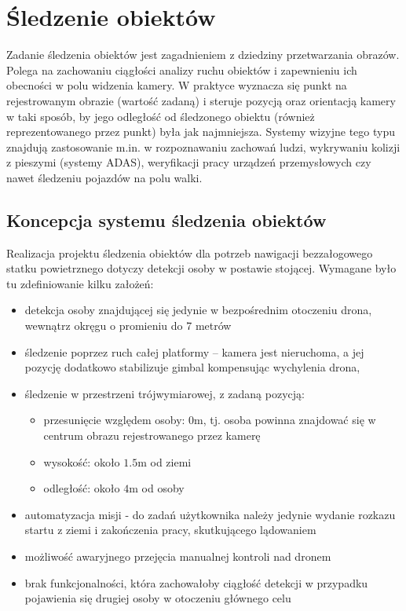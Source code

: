 
\chapter{Śledzenie obiektów}
\label{cha:sledzenieObiektow}

Zadanie śledzenia obiektów jest zagadnieniem z dziedziny przetwarzania obrazów. Polega na zachowaniu ciągłości analizy ruchu obiektów i zapewnieniu ich obecności w polu widzenia kamery. W praktyce wyznacza się punkt na rejestrowanym obrazie (wartość zadaną) i steruje pozycją oraz orientacją kamery w taki sposób, by jego odległość od śledzonego obiektu (również reprezentowanego przez punkt) była jak najmniejsza. Systemy wizyjne tego typu znajdują zastosowanie m.in. w rozpoznawaniu zachowań ludzi, wykrywaniu kolizji z pieszymi (systemy ADAS), weryfikacji pracy urządzeń przemysłowych czy nawet śledzeniu pojazdów na polu walki.
\section{Koncepcja systemu śledzenia obiektów}
\label{sec:koncepcja}
Realizacja projektu śledzenia obiektów dla potrzeb nawigacji bezzałogowego statku powietrznego dotyczy detekcji osoby w postawie stojącej. Wymagane było tu zdefiniowanie kilku założeń:
\begin{itemize}
	\item detekcja osoby znajdującej się jedynie w bezpośrednim otoczeniu drona, wewnątrz okręgu o promieniu do 7 metrów
	\item śledzenie poprzez ruch całej platformy -- kamera jest nieruchoma, a jej pozycję dodatkowo stabilizuje gimbal kompensując wychylenia drona,
	\item śledzenie w przestrzeni trójwymiarowej, z zadaną pozycją:
	\begin{itemize}
		\item przesunięcie względem osoby: $0$m, tj. osoba powinna znajdować się w centrum obrazu rejestrowanego przez kamerę
		\item wysokość: około $1.5$m od ziemi
		\item odległość: około $4$m od osoby
	\end{itemize} 
	\item automatyzacja misji - do zadań użytkownika należy jedynie wydanie rozkazu startu z ziemi i zakończenia pracy, skutkującego lądowaniem
	\item możliwość awaryjnego przejęcia manualnej kontroli nad dronem
	\item brak funkcjonalności, która zachowałoby ciągłość detekcji w przypadku pojawienia się drugiej osoby w otoczeniu głównego celu
\end{itemize}

